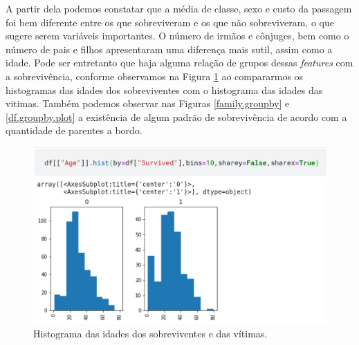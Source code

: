 A partir dela podemos constatar que a média de classe, sexo e custo da passagem foi bem diferente entre os que sobreviveram e os que não sobreviveram, o que sugere serem variáveis importantes. O número de irmãos e cônjuges, bem como o número de pais e filhos apresentaram uma diferença mais sutil, assim como a idade. Pode ser entretanto que haja alguma relação de grupos dessas \emph{features} com a sobrevivência, conforme observamos na Figura \ref{age.hist} ao compararmos os histogramas das idades dos sobreviventes com o histograma das idades das vitimas. 
Também podemos observar nas Figuras \ref{family.groupby} e \ref{df.groupby.plot} a existência de algum padrão de sobrevivência de acordo com a quantidade de parentes a bordo. 
\begin{figure}[H]
\centering
\includegraphics[width=\textwidth]{Figures/age.hist.png}
\caption{Histograma das idades dos sobreviventes e das vítimas.}
\label{age.hist}
\end{figure}

